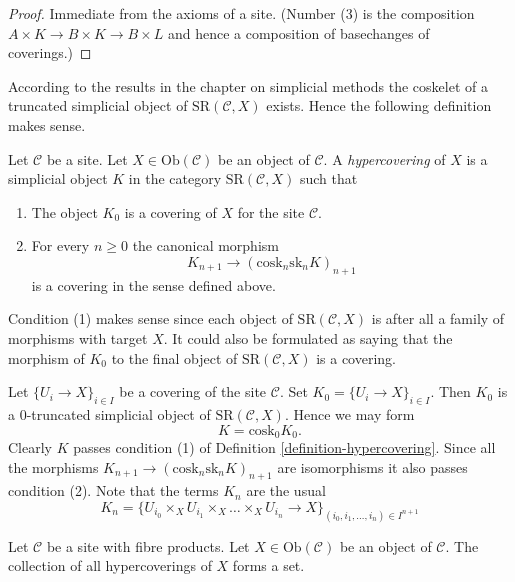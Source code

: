 \begin{proof}
Immediate from the axioms of a site.
(Number (3) is the composition $A \times K \to B \times K \to B \times L$
and hence a composition of basechanges of coverings.)
\end{proof}

\noindent
According to the results in the chapter on simplicial methods the
coskelet of a truncated simplicial object of
$\text{SR}(\mathcal{C}, X)$ exists. Hence the following
definition makes sense.

\begin{definition}
\label{definition-hypercovering}
Let $\mathcal{C}$ be a site.
Let $X \in \text{Ob}(\mathcal{C})$ be an object of $\mathcal{C}$.
A {\it hypercovering} of $X$ is a simplicial object
$K$ in the category $\text{SR}(\mathcal{C}, X)$ such that
\begin{enumerate}
\item The object $K_0$ is a covering of $X$ for the site $\mathcal{C}$.
\item For every $n \geq 0$ the canonical morphism
$$
K_{n + 1} \longrightarrow (\text{cosk}_n \text{sk}_n K)_{n + 1}
$$
is a covering in the sense defined above.
\end{enumerate}
\end{definition}

\noindent
Condition (1) makes sense since each object of
$\text{SR}(\mathcal{C}, X)$ is after all a family
of morphisms with target $X$. It could also be
formulated as saying that the morphism of $K_0$ to
the final object of $\text{SR}(\mathcal{C}, X)$
is a covering.

\begin{example}
\label{example-cech}
Let $\{U_i \to X\}_{i \in I}$ be a covering of the site $\mathcal{C}$.
Set $K_0 = \{U_i \to X\}_{i \in I}$.
Then $K_0$ is a $0$-truncated simplicial object of
$\text{SR}(\mathcal{C}, X)$. Hence we may form
$$
K = \text{cosk}_0 K_0.
$$
Clearly $K$ passes condition (1) of Definition \ref{definition-hypercovering}.
Since all the morphisms $K_{n + 1} \to (\text{cosk}_n \text{sk}_n K)_{n + 1}$
are isomorphisms it also passes condition (2). Note that
the terms $K_n$ are the usual
$$
K_n = \{
U_{i_0} \times_X U_{i_1} \times_X \ldots \times_X U_{i_n} \to X
\}_{(i_0, i_1, \ldots, i_n) \in I^{n + 1}}
$$
\end{example}

\begin{lemma}
\label{lemma-hypercoverings-set}
Let $\mathcal{C}$ be a site with fibre products.
Let $X \in \text{Ob}(\mathcal{C})$ be an object of $\mathcal{C}$.
The collection of all hypercoverings of $X$ forms a set.
\end{lemma}


